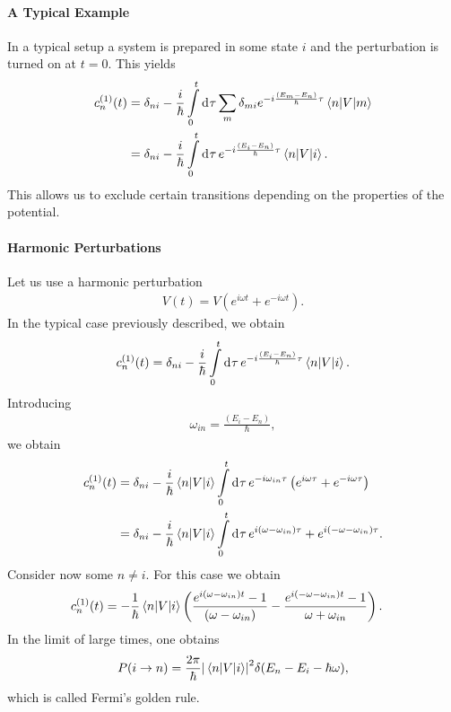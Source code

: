 \paragraph{A Typical Example}
In a typical setup a system is prepared in some state $i$ and the perturbation is turned on at $t = 0$. This yields
\begin{align*}
	c_{n}^{(1)}(t) &= \delta_{ni} - \frac{i}{\hbar}\int\limits_{0}^{t}\dd[]{\tau}\sum\limits_{m}\delta_{mi}e^{-i\frac{(E_{m} - E_{n})}{\hbar}\tau}\mel{n}{V}{m} \\
	               &= \delta_{ni} - \frac{i}{\hbar}\int\limits_{0}^{t}\dd[]{\tau}e^{-i\frac{(E_{i} - E_{n})}{\hbar}\tau}\mel{n}{V}{i}.
\end{align*}
This allows us to exclude certain transitions depending on the properties of the potential.

\paragraph{Harmonic Perturbations}
Let us use a harmonic perturbation
\begin{align*}
	V(t) = V\left(e^{i\omega t} + e^{-i\omega t}\right).
\end{align*}
In the typical case previously described, we obtain
\begin{align*}
	c_{n}^{(1)}(t) = \delta_{ni} - \frac{i}{\hbar}\int\limits_{0}^{t}\dd[]{\tau}e^{-i\frac{(E_{i} - E_{n})}{\hbar}\tau}\mel{n}{V}{i}.
\end{align*}
Introducing
\begin{align*}
	\omega_{in} = \frac{(E_{i} - E_{n})}{\hbar},
\end{align*}
we obtain
\begin{align*}
	c_{n}^{(1)}(t) &= \delta_{ni} - \frac{i}{\hbar}\mel{n}{V}{i}\int\limits_{0}^{t}\dd[]{\tau}e^{-i\omega_{in}\tau}\left(e^{i\omega\tau} + e^{-i\omega\tau}\right) \\
	               &= \delta_{ni} - \frac{i}{\hbar}\mel{n}{V}{i}\int\limits_{0}^{t}\dd[]{\tau}e^{i(\omega - \omega_{in})\tau} + e^{i(-\omega - \omega_{in})\tau}.
\end{align*}
Consider now some $n\neq i$. For this case we obtain
\begin{align*}
	c_{n}^{(1)}(t) &= -\frac{1}{\hbar}\mel{n}{V}{i}\left(\frac{e^{i(\omega - \omega_{in})t} - 1}{(\omega - \omega_{in})} - \frac{e^{i(-\omega - \omega_{in})t} - 1}{\omega + \omega_{in}}\right).
\end{align*}
In the limit of large times, one obtains
\begin{align*}
	P(i\to n) = \frac{2\pi}{\hbar}\abs{\mel{n}{V}{i}}^{2}\delta(E_{n} - E_{i} - \hbar\omega),
\end{align*}
which is called Fermi's golden rule.

